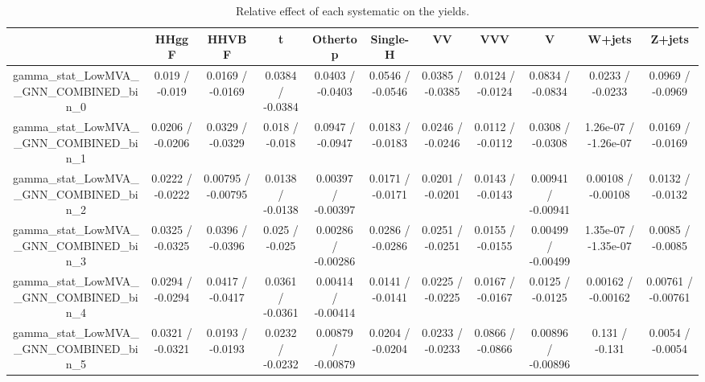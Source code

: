 \documentclass[10pt]{article}
\begin{document}
\begin{table}[htbp]
\begin{center}
\begin{tabular}{|c|c|c|c|c|c|c|c|c|c|c|}
\hline 
      & HHggF      & HHVBF      & t      & Othertop      & Single-H      & VV      & VVV      & V      & W+jets      & Z+jets \\ 
\hline 
  gamma_stat_LowMVA__GNN_COMBINED_bin_0 & 0.019 / -0.019 & 0.0169 / -0.0169 & 0.0384 / -0.0384 & 0.0403 / -0.0403 & 0.0546 / -0.0546 & 0.0385 / -0.0385 & 0.0124 / -0.0124 & 0.0834 / -0.0834 & 0.0233 / -0.0233 & 0.0969 / -0.0969 \\ 
  gamma_stat_LowMVA__GNN_COMBINED_bin_1 & 0.0206 / -0.0206 & 0.0329 / -0.0329 & 0.018 / -0.018 & 0.0947 / -0.0947 & 0.0183 / -0.0183 & 0.0246 / -0.0246 & 0.0112 / -0.0112 & 0.0308 / -0.0308 & 1.26e-07 / -1.26e-07 & 0.0169 / -0.0169 \\ 
  gamma_stat_LowMVA__GNN_COMBINED_bin_2 & 0.0222 / -0.0222 & 0.00795 / -0.00795 & 0.0138 / -0.0138 & 0.00397 / -0.00397 & 0.0171 / -0.0171 & 0.0201 / -0.0201 & 0.0143 / -0.0143 & 0.00941 / -0.00941 & 0.00108 / -0.00108 & 0.0132 / -0.0132 \\ 
  gamma_stat_LowMVA__GNN_COMBINED_bin_3 & 0.0325 / -0.0325 & 0.0396 / -0.0396 & 0.025 / -0.025 & 0.00286 / -0.00286 & 0.0286 / -0.0286 & 0.0251 / -0.0251 & 0.0155 / -0.0155 & 0.00499 / -0.00499 & 1.35e-07 / -1.35e-07 & 0.0085 / -0.0085 \\ 
  gamma_stat_LowMVA__GNN_COMBINED_bin_4 & 0.0294 / -0.0294 & 0.0417 / -0.0417 & 0.0361 / -0.0361 & 0.00414 / -0.00414 & 0.0141 / -0.0141 & 0.0225 / -0.0225 & 0.0167 / -0.0167 & 0.0125 / -0.0125 & 0.00162 / -0.00162 & 0.00761 / -0.00761 \\ 
  gamma_stat_LowMVA__GNN_COMBINED_bin_5 & 0.0321 / -0.0321 & 0.0193 / -0.0193 & 0.0232 / -0.0232 & 0.00879 / -0.00879 & 0.0204 / -0.0204 & 0.0233 / -0.0233 & 0.0866 / -0.0866 & 0.00896 / -0.00896 & 0.131 / -0.131 & 0.0054 / -0.0054 \\ 
\hline 
\end{tabular} 
\caption{Relative effect of each systematic on the yields.} 
\end{center} 
\end{table} 
\end{document}
